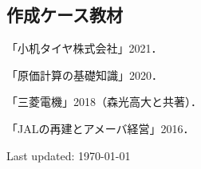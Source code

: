 \documentclass[letterpaper,uplatex]{article}
\def\footerlink{http://jblevins.org/projects/cv-template/}
\renewenvironment{itemize}{
  \begin{list}{}{
    \setlength{\leftmargin}{1.5em}
  }
}{
  \end{list}
}
\begin{document}
\subsection*{作成ケース教材}

\begin{itemize}
    \item 「小机タイヤ株式会社」2021．
   \item 「原価計算の基礎知識」2020． 
   \item 「三菱電機」2018（森光高大と共著）．
   \item 「JALの再建とアメーバ経営」2016．
\end{itemize}

\bigskip

\begin{center}
  \begin{footnotesize}
    Last updated: \today \\
  \end{footnotesize}
\end{center}
\end{document}
